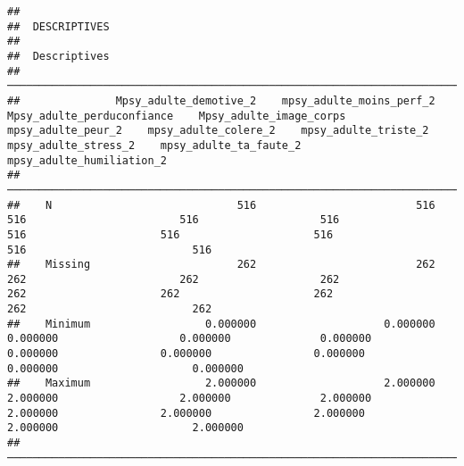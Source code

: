 \documentclass[
]{article}
\begin{document}
\begin{verbatim}
## 
##  DESCRIPTIVES
## 
##  Descriptives                                                                                                                                                                                                                                                                    
##  ─────────────────────────────────────────────────────────────────────────────────────────────────────────────────────────────────────────────────────────────────────────────────────────────────────────────────────────────────────────────────────────────────────────────── 
##               Mpsy_adulte_demotive_2    mpsy_adulte_moins_perf_2    Mpsy_adulte_perduconfiance    Mpsy_adulte_image_corps    mpsy_adulte_peur_2    mpsy_adulte_colere_2    mpsy_adulte_triste_2    mpsy_adulte_stress_2    mpsy_adulte_ta_faute_2    mpsy_adulte_humiliation_2   
##  ─────────────────────────────────────────────────────────────────────────────────────────────────────────────────────────────────────────────────────────────────────────────────────────────────────────────────────────────────────────────────────────────────────────────── 
##    N                             516                         516                           516                        516                   516                     516                     516                     516                       516                          516   
##    Missing                       262                         262                           262                        262                   262                     262                     262                     262                       262                          262   
##    Minimum                  0.000000                    0.000000                      0.000000                   0.000000              0.000000                0.000000                0.000000                0.000000                  0.000000                     0.000000   
##    Maximum                  2.000000                    2.000000                      2.000000                   2.000000              2.000000                2.000000                2.000000                2.000000                  2.000000                     2.000000   
##  ───────────────────────────────────────────────────────────────────────────────────────────────────────────────────────────────────────────────────────────────────────────────────────────────────────────────────────────────────────────────────────────────────────────────
\end{verbatim}
\end{document}
